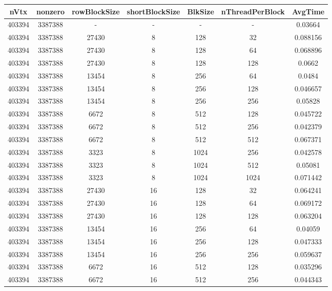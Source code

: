 \documentclass[9pt]{article}
\begin{document}
\SetBgPosition{0.25cm,-5.0cm}
\begin{tabular}{|c|c|c|c|c|c|c| }  
\hline
nVtx  & nonzero  & rowBlockSize  & shortBlockSize  & BlkSize  & nThreadPerBlock  & AvgTime \\
\hline
403394  & 3387388  &  -  & -  & -  & -  &0.03664 \\
\hline
403394  & 3387388  & 27430  & 8  & 128  & 32  & 0.088156 \\
\hline
403394  & 3387388  & 27430  & 8  & 128  & 64  & 0.068896 \\
\hline
403394  & 3387388  & 27430  & 8  & 128  & 128  & 0.0662 \\
\hline
403394  & 3387388  & 13454  & 8  & 256  & 64  & 0.0484 \\
\hline
403394  & 3387388  & 13454  & 8  & 256  & 128  & 0.046657 \\
\hline
403394  & 3387388  & 13454  & 8  & 256  & 256  & 0.05828 \\
\hline
403394  & 3387388  & 6672  & 8  & 512  & 128  & 0.045722 \\
\hline
403394  & 3387388  & 6672  & 8  & 512  & 256  & 0.042379 \\
\hline
403394  & 3387388  & 6672  & 8  & 512  & 512  & 0.067371 \\
\hline
403394  & 3387388  & 3323  & 8  & 1024  & 256  & 0.042578 \\
\hline
403394  & 3387388  & 3323  & 8  & 1024  & 512  & 0.05081 \\
\hline
403394  & 3387388  & 3323  & 8  & 1024  & 1024  & 0.071442 \\
\hline
403394  & 3387388  & 27430  & 16  & 128  & 32  & 0.064241 \\
\hline
403394  & 3387388  & 27430  & 16  & 128  & 64  & 0.069172 \\
\hline
403394  & 3387388  & 27430  & 16  & 128  & 128  & 0.063204 \\
\hline
403394  & 3387388  & 13454  & 16  & 256  & 64  & 0.04059 \\
\hline
403394  & 3387388  & 13454  & 16  & 256  & 128  & 0.047333 \\
\hline
403394  & 3387388  & 13454  & 16  & 256  & 256  & 0.059637 \\
\hline
403394  & 3387388  & 6672  & 16  & 512  & 128  & 0.035296 \\
\hline
403394  & 3387388  & 6672  & 16  & 512  & 256  & 0.044343 \\
\hline

\end{tabular}
\end{document}
